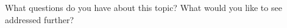 \documentclass{ximera}
\begin{document}
\begin{question}
\begin{solution}
    \begin{multiple-choice}
    \end{multiple-choice}

  \end{solution}
\end{question}

What questions do you have about this topic?  What would you like to see addressed further?
\begin{free-response}
\end{free-response}
\end{document}
